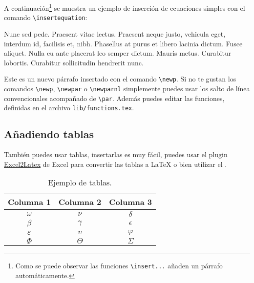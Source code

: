		A continuación\footnote{Como se puede observar las funciones \texttt{\textbackslash insert...} añaden un párrafo automáticamente.} se muestra un ejemplo de inserción de ecuaciones simples con el comando \texttt{\textbackslash insertequation}:
		
		
		Nunc sed pede. Praesent vitae lectus. Praesent neque justo, vehicula eget, interdum id, facilisis et, nibh. Phasellus at purus et libero lacinia dictum. Fusce aliquet. Nulla eu ante placerat leo semper dictum. Mauris metus. Curabitur lobortis. Curabitur sollicitudin hendrerit nunc.
		
		\newp Este es un nuevo párrafo insertado con el comando \texttt{\textbackslash newp}. Si no te gustan los comandos \texttt{\textbackslash newp}, \texttt{\textbackslash newpar} o \texttt{\textbackslash newparnl} simplemente puedes usar los salto de línea convencionales acompañado de \texttt{\textbackslash par}. Además puedes editar las funciones, definidas en el archivo \texttt{lib/functions.tex}.
		
	\subsection{Añadiendo tablas}
		
		\newp También puedes usar tablas, insertarlas es muy fácil, puedes usar el plugin \href{https://www.ctan.org/tex-archive/support/excel2latex/}{Excel2Latex} \cite{ref2} de Excel para convertir las tablas a \LaTeX\xspace o bien utilizar el  \cite{ref3}.
		
		\begin{table}[htbp]
			\centering
			\caption{Ejemplo de tablas.}
			\begin{tabular}{ccc}
				\hline
				\textbf{Columna 1} & \textbf{Columna 2} & \textbf{Columna 3} \bigstrut\\
				\hline
				$\omega$ & $\nu$ & $\delta$ \bigstrut[t]\\
				$\beta$ & $\gamma$ & $\epsilon$ \\
				$\varepsilon$ & $\upsilon$ & $\varphi$\\
				$\Phi$ & $\Theta$ & $\varSigma$ \bigstrut[b]\\
				\hline
			\end{tabular}
			\label{tab:tabla-1}
		\end{table}

